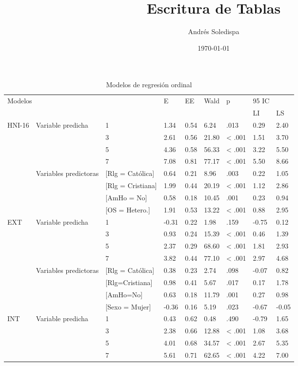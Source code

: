 \documentclass[a4paper,12pt]{article}
\title{Escritura de Tablas}
\author{Andrés Soledispa}
\date{\today}
\begin{document}
 \maketitle
\begin{table}
\label{tabla:03}
\caption{Modelos de regresión ordinal}
\begin{tabular}{lllllllll}
\hline 
\multicolumn{3}{l}{\multirow{2}{*}{Modelos}} & \multirow{2}{*}{E} &\multirow{2}{*}{EE} & \multirow{2}{*}{Wald}& \multirow{2}{*}{p} & 95 IC\\ \cline{8-9}
& & & & & & & LI & LS \\ \hline
\multirow{8}{*}{HNI-16}&\multirow{4}{*}{Variable predicha}&1& 1.34& 0.54& 6.24& .013& 0.29& 2.40\\
&& 3& 2.61& 0.56& 21.80& < .001& 1.51& 3.70\\
&& 5& 4.36& 0.58 &56.33& < .001& 3.22 &5.50\\
&& 7& 7.08& 0.81& 77.17& < .001& 5.50& 8.66\\
& \multirow{4}{*}{Variables predictoras}&[Rlg = Católica]& 0.64& 0.21& 8.96& .003& 0.22& 1.05\\
&&[Rlg = Cristiana]& 1.99& 0.44& 20.19& < .001& 1.12& 2.86\\
&&[AmHo = No]& 0.58& 0.18& 10.45& .001& 0.23& 0.94\\
&&[OS = Hetero.]& 1.91& 0.53& 13.22& < .001& 0.88& 2.95\\
\multirow{8}{*}{EXT}&\multirow{4}{*}{Variable predicha}& 1& -0.31& 0.22& 1.98& .159& -0.75& 0.12\\
&&3& 0.93& 0.24& 15.39& < .001& 0.46& 1.39\\
&&5& 2.37& 0.29& 68.60& < .001& 1.81& 2.93\\
&&7& 3.82& 0.44& 77.10& < .001& 2.97& 4.68\\
& \multirow{4}{*}{Variables predictoras}& [Rlg = Católica]& 0.38& 0.23& 2.74& .098& -0.07& 0.82\\
&&[Rlg=Cristiana]& 0.98& 0.41& 5.67& .017& 0.17& 1.78\\
&&[AmHo=No]& 0.63& 0.18& 11.79& .001& 0.27& 0.98\\
&&[Sexo = Mujer]& -0.36& 0.16& 5.19& .023& -0.67& -0.05\\
\multirow{7}{*}{INT}&\multirow{4}{*}{Variable predicha}& 1& 0.43& 0.62& 0.48& .490& -0.79& 1.65\\
&&3& 2.38& 0.66& 12.88& < .001& 1.08& 3.68\\
&&5& 4.01& 0.68& 34.57& < .001& 2.67& 5.35\\
&&7& 5.61& 0.71& 62.65& < .001& 4.22& 7.00\\

\end{tabular}
\end{table}
\end{document}
